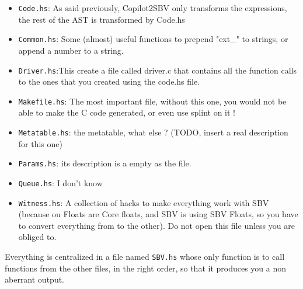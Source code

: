 \begin{itemize}
	\item \texttt{Code.hs}: As said previously, Copilot2SBV only transforms the expressions, the rest of the AST is transformed by Code.hs
	\item \texttt{Common.hs}: Some (almost) useful functions to prepend "ext\_" to strings, or append a number to a string.
	\item \texttt{Driver.hs}:This create a file called driver.c that contains all the function calls to the ones that you created using the code.hs file.
	\item \texttt{Makefile.hs}: The most important file, without this one, you would not be able to make the C code generated, or even use splint on it !
	\item \texttt{Metatable.hs}: the metatable, what else ? (TODO, insert a real description for this one)
	\item \texttt{Params.hs}: its description is a empty as the file.
	\item \texttt{Queue.hs}: I don't know
	\item \texttt{Witness.hs}: A collection of hacks to make everything work with SBV (because ou Floats are Core floats, and SBV is using SBV Floats, so you have to convert everything from to the other). Do not open this file unless you are obliged to.
\end{itemize}

Everything is centralized in a file named \texttt{SBV.hs} whose only function is to call functions from the other files, in the right order, so that it produces you a non aberrant output.